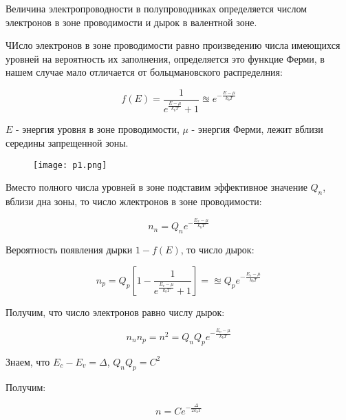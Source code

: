 \documentclass[a4paper]{article}
\begin{document}
Величина электропроводности в полупроводниках определяется числом электронов в зоне проводимости и дырок в 
валентной зоне. \par 

ЧИсло электронов в зоне проводимости равно произведению числа имеющихся уровней на вероятность их заполнения, определяется это функцие Ферми, 
в нашем случае мало отличается от больцмановского распределния: 

\begin{equation}
    f(E) = \frac{1}{e^{\frac{E - \mu}{k_b T}}+1} \approxeq e^{- \frac{E - \mu}{k_b T}}
\end{equation}

$E$ - энергия уровня в зоне проводимости, $\mu$ - энергия Ферми, лежит вблизи середины запрещенной зоны. \par 

\begin{figure}[H]
    \begin{center}
        \texttt{[image: p1.png]}
        \caption{}
        \label{p1}
    \end{center}
\end{figure}


Вместо полного числа уровней в зоне подставим эффективное значение $Q_n$, вблизи дна зоны, то число жлектронов в зоне проводимости:

\begin{equation}
    n_n = Q_n e^{- \frac{E_x - \mu}{k_b T}}
\end{equation}

Вероятность появления дырки $1-f(E)$, то число дырок:

\begin{equation}
    n_p = Q_p \left[ 1 - \frac{1}{e^{\frac{E_v - \mu}{k_bT}}+1} \right] =\approxeq Q_p e^{- \frac{E_v - \mu}{k_b T}}
\end{equation}


Получим, что число электронов равно числу дырок:

\begin{equation}
    n_n n_p = n^2 = Q_n Q_p e^{- \frac{E_v - \mu}{k_b T}}
\end{equation}

Знаем, что $E_c - E_v = \Delta$, $Q_n Q_p = C^2$

Получим:

\begin{equation}
    n = C e^{- \frac{\Delta}{2 k_b T}}
\end{equation}
\end{document}
